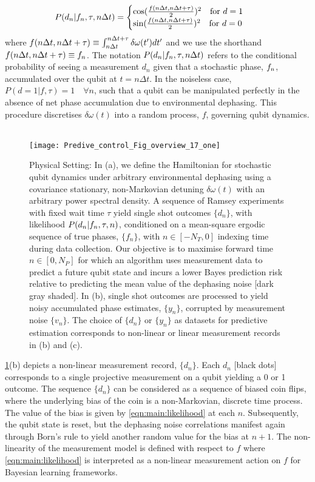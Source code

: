 \begin{align}
P(d_n | f_n, \tau, n \Delta t) &= \begin{cases} \cos(\frac{f(n \Delta t, n\Delta t + \tau)}{2})^2 \quad \text{for $d=1$} \\   \sin(\frac{f(n \Delta t, n\Delta t + \tau)}{2})^2  \quad \text{for $ d=0$} \end{cases} \label{eqn:main:likelihood}
\end{align}
where  $ f(n \Delta t, n\Delta t + \tau) \equiv \int_{n \Delta t}^{n \Delta t +\tau} \delta \omega(t') dt'$ and we use the shorthand $f(n \Delta t , n\Delta t + \tau) \equiv f_n$. The notation $P(d_n | f_n, \tau, n \Delta t)$ refers to the conditional probability of seeing a measurement $d_n$ given that a stochastic phase, $f_n$, accumulated over the qubit at $t = n \Delta t$. In the noiseless case, $P(d=1| f, \tau) = 1 \quad \forall n $, such that a qubit can be manipulated perfectly in the absence of net phase accumulation due to environmental dephasing. This procedure discretises $\delta \omega(t)$ into a random process, $f$, governing qubit dynamics. 
\\
\\
\begin{figure}[h!]
    \texttt{[image: Predive\_control\_Fig\_overview\_17\_one]} 
    \caption{ \label{fig:main:Predive_control_Fig_overview_17_one} Physical Setting: In (a), we define the Hamiltonian for stochastic qubit dynamics under arbitrary environmental dephasing using a covariance stationary, non-Markovian detuning $\delta \omega(t)$ with an arbitrary power spectral density. A sequence of Ramsey experiments with fixed wait time $\tau$ yield single shot outcomes $\{ d_n \}$, with likelihood $P(d_n|f_n, \tau,n)$,  conditioned on a mean-square ergodic sequence of true phases, $\{ f_n\}$, with $n \in [-N_T, 0]$ indexing time during data collection. Our objective is to maximise forward time $n \in [0, N_P]$ for which an algorithm uses measurement data to predict a future qubit state and incurs a lower Bayes prediction risk relative to predicting the mean value of the dephasing noise [dark gray shaded]. In (b), single shot outcomes are processed to yield noisy accumulated phase estimates, $\{ y_n\}$, corrupted by measurement noise $\{v_n\}$. The choice of $\{d_n\}$ or $\{y_n\}$ as datasets for predictive estimation corresponds to non-linear or linear measurement records in (b) and (c).}
\end{figure} 
\cref{fig:main:Predive_control_Fig_overview_17_one}(b) depicts a non-linear measurement record, $\{ d_n\}$. Each $d_n$ [black dots] corresponds to a single projective measurement on a qubit yielding a 0 or 1 outcome. The sequence $\{ d_n\}$ can be considered as a sequence of biased coin flips, where the underlying bias of the coin is a non-Markovian, discrete time process. The value of the bias is given by \cref{eqn:main:likelihood} at each $n$. Subsequently, the qubit state is reset, but the dephasing noise correlations manifest again through Born's rule to yield another random value for the bias at $n+1$. The non-linearity of the measurement model is defined with respect to $f$ where \cref{eqn:main:likelihood} is interpreted as a non-linear measurement action on $f$ for Bayesian learning frameworks. 

